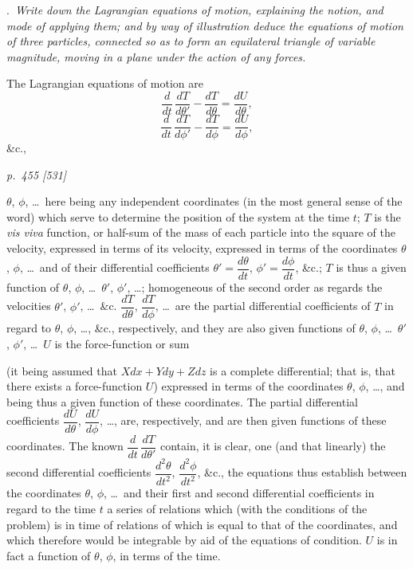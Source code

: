 \documentclass[11pt,a4paper]{book}
\begin{document}
\medskip
{}.\ \textit{Write down the Lagrangian equations of motion, explaining the notion, and
mode of applying them; and by way of illustration deduce the equations of motion of
three particles, connected so as to form an equilateral triangle of variable magnitude,
moving in a plane under the action of any forces.}

\medskip
The Lagrangian equations of motion are
\[
\frac{d}{dt}\,\frac{dT}{d\theta'} - \frac{dT}{d\theta} = \frac{dU}{d\theta},
\]
\[
\frac{d}{dt}\,\frac{dT}{d\phi'} - \frac{dT}{d\phi} = \frac{dU}{d\phi},
\]
\&c.,

\clearpage

\bigskip
\textit{p.~455 [531]}
\smallskip

\noindent
$\theta$, $\phi$, \ldots\ here being any independent coordinates (in the most general sense of the word) which serve to determine the position of the system at the time $t$; $T$ is the \textit{vis viva} function, or half-sum of the mass of each particle into the square of the velocity, expressed in terms of its velocity, expressed in terms of the coordinates $\theta$, $\phi$, \ldots\ and of their differential coefficients $\theta' = \dfrac{d\theta}{dt}$, $\phi' = \dfrac{d\phi}{dt}$, \&c.; $T$ is thus a given function of $\theta$, $\phi$, \ldots\ $\theta'$, $\phi'$, \ldots; homogeneous of the second order as regards the velocities $\theta'$, $\phi'$, \ldots\ \&c. $\dfrac{dT}{d\theta}$, $\dfrac{dT}{d\phi}$, \ldots\ are the partial differential coefficients of $T$ in regard to $\theta$, $\phi$, \ldots, \&c., respectively, and they are also given functions of $\theta$, $\phi$, \ldots\ $\theta'$, $\phi'$, \ldots\ $U$ is the force-function or sum

(it being assumed that $Xdx + Ydy + Zdz$ is a complete differential; that is, that there exists a force-function $U$) expressed in terms of the coordinates $\theta$, $\phi$, \ldots, and being thus a given function of these coordinates. The partial differential coefficients $\dfrac{dU}{d\theta}$, $\dfrac{dU}{d\phi}$, \ldots, are, respectively, and are then given functions of these coordinates. The known $\dfrac{d}{dt}\,\dfrac{dT}{d\theta'}$ contain, it is clear, one (and that linearly) the second differential coefficients $\dfrac{d^2\theta}{dt^2}$, $\dfrac{d^2\phi}{dt^2}$, \&c., the equations thus establish between the coordinates $\theta$, $\phi$, \ldots\ and their first and second differential coefficients in regard to the time $t$ a series of relations which (with the conditions of the problem) is in time of relations of which is equal to that of the coordinates, and which therefore would be integrable by aid of the equations of condition. $U$ is in fact a function of $\theta$, $\phi$, in terms of the time.
\end{document}
